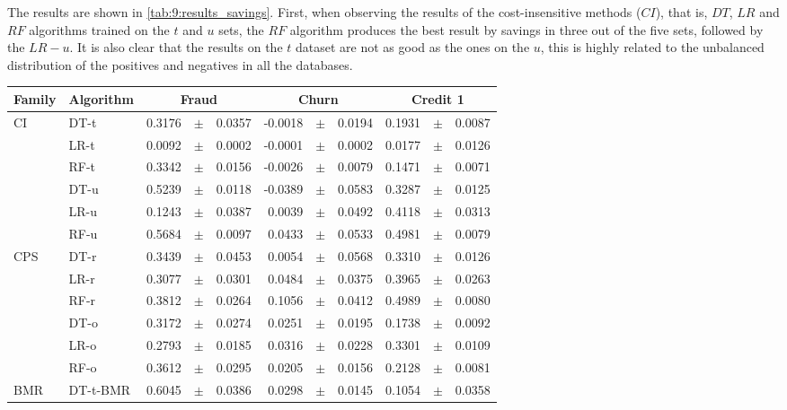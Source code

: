    The results are shown in \tablename{ \ref{tab:9:results_savings}}. First, when observing  the 
  results of the cost-insensitive methods ($CI$), that is, $DT$, $LR$ and $RF$ algorithms trained 
  on the $t$ and $u$ sets, the $RF$ algorithm produces the best result by savings in three out of 
  the five sets, followed by the $LR-u$. It is also clear that the results on the $t$ dataset are 
  not as good as the ones on the $u$, this is highly related to the unbalanced distribution of the 
  positives and negatives in all the databases.

\begin{table}[!t]
    \centering
    \footnotesize
    \begin{tabular}{l l r@{\hskip 0in}c@{\hskip 0in}l r@{\hskip 0in}c@{\hskip 0in}l r@{\hskip 
    0in}c@{\hskip 0in}l  } %
    \hline
    \bf{Family} & \bf{Algorithm} & \multicolumn{3}{c}{\bf{Fraud}} & 
    \multicolumn{3}{c}{\bf{Churn}} & \multicolumn{3}{c}{\bf{Credit 1}} \\ 
    \hline
CI&DT-t & 0.3176 &$\pm$& 0.0357 & -0.0018 &$\pm$& 0.0194 & 0.1931 &$\pm$& 0.0087 \\
&LR-t & 0.0092 &$\pm$& 0.0002 & -0.0001 &$\pm$& 0.0002 & 0.0177 &$\pm$& 0.0126 \\
&RF-t & 0.3342 &$\pm$& 0.0156 & -0.0026 &$\pm$& 0.0079 & 0.1471 &$\pm$& 0.0071\\
&DT-u & 0.5239 &$\pm$& 0.0118 & -0.0389 &$\pm$& 0.0583 & 0.3287 &$\pm$& 0.0125 \\
&LR-u & 0.1243 &$\pm$& 0.0387 & 0.0039 &$\pm$& 0.0492 & 0.4118 &$\pm$& 0.0313 \\
&RF-u & 0.5684 &$\pm$& 0.0097 & 0.0433 &$\pm$& 0.0533 & 0.4981 &$\pm$& 0.0079 \\
\hline 
CPS&DT-r & 0.3439 &$\pm$& 0.0453 & 0.0054 &$\pm$& 0.0568 & 0.3310 &$\pm$& 0.0126 \\
&LR-r & 0.3077 &$\pm$& 0.0301 & 0.0484 &$\pm$& 0.0375 & 0.3965 &$\pm$& 0.0263 \\
&RF-r & 0.3812 &$\pm$& 0.0264 & 0.1056 &$\pm$& 0.0412 & 0.4989 &$\pm$& 0.0080 \\
&DT-o & 0.3172 &$\pm$& 0.0274 & 0.0251 &$\pm$& 0.0195 & 0.1738 &$\pm$& 0.0092 \\
&LR-o & 0.2793 &$\pm$& 0.0185 & 0.0316 &$\pm$& 0.0228 & 0.3301 &$\pm$& 0.0109 \\
&RF-o & 0.3612 &$\pm$& 0.0295 & 0.0205 &$\pm$& 0.0156 & 0.2128 &$\pm$& 0.0081 \\
\hline 
BMR&DT-t-BMR & 0.6045 &$\pm$& 0.0386 & 0.0298 &$\pm$& 0.0145 & 0.1054 &$\pm$& 0.0358 \\

\end{tabular}
\end{table}
